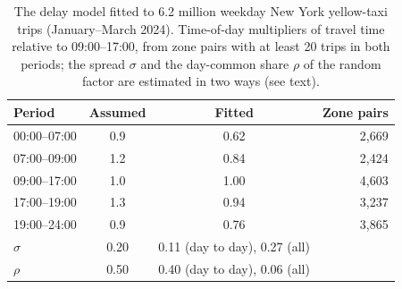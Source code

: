 \begin{table}[t]
\centering
\small
\caption{The delay model fitted to 6.2 million weekday New York yellow-taxi trips (January--March 2024). Time-of-day multipliers of travel time relative to 09:00--17:00, from zone pairs with at least 20 trips in both periods; the spread $\sigma$ and the day-common share $\rho$ of the random factor are estimated in two ways (see text).}
\label{tab:nyc}
\begin{tabular}{@{}lccr@{}}
\toprule
Period & Assumed & Fitted & Zone pairs\\
\midrule
00:00--07:00 & 0.9 & 0.62 & 2{,}669\\
07:00--09:00 & 1.2 & 0.84 & 2{,}424\\
09:00--17:00 & 1.0 & 1.00 & 4{,}603\\
17:00--19:00 & 1.3 & 0.94 & 3{,}237\\
19:00--24:00 & 0.9 & 0.76 & 3{,}865\\
\midrule
$\sigma$ & 0.20 & 0.11 (day to day), 0.27 (all) & \\
$\rho$ & 0.50 & 0.40 (day to day), 0.06 (all) & \\
\bottomrule
\end{tabular}
\end{table}
